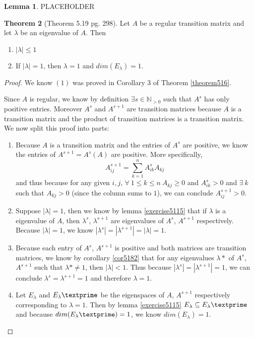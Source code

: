 \documentclass{amsart}
\theoremstyle{definition}
\newtheorem{theorem}{Theorem}
\newtheorem{lemma}[theorem]{Lemma}
\theoremstyle{remark}
\numberwithin{equation}{section}
\begin{document}
\begin{lemma}

PLACEHOLDER
\end{lemma}

\begin{theorem}[Theorem 5.19 pg. 298]\label{theorem519}
Let $A$ be a regular transition matrix and let $\lambda$ be an eigenvalue of $A$.  Then 

\begin{enumerate}
	\item $|\lambda| \leq 1$
	\item If $|\lambda| = 1$, then $\lambda = 1$ and $dim(E_{\lambda}) = 1$.

\end{enumerate}

\end{theorem}

\begin{proof}

We know $(1)$ was proved in Corollary 3 of Theorem \ref{theorem516}.

Since $A$ is regular, we know by definition $\exists s \in \mathbb{N}_{>0}$ such that $A^s$ has only positive entries.
Moreover $A^s$ and $A^{s+1}$ are transition matrices because $A$ is a transition matrix and the product of transition matrices is a transition matrix.
We now split this proof into parts:

\begin{enumerate}
	\item 
		Because $A$ is a transition matrix and the entries of $A^s$ are positive, we know the entries of $A^{s+1} = A^s(A)$ are positive.
		More specifically,
		$$A^{s+1}_{ij} = \sum_{k = 1}^nA^s_{ik}A_{kj}$$
		and thus because for any given $i, j$, $\forall\ 1 \leq k \leq n\ A_{kj} \geq 0$ and $A^s_{ik} > 0$ and $\exists\ k$ such that $A_{kj}  > 0$ (since the column sums to $1$), we can conclude $A^{s+1}_{ij} > 0$.

	\item 
		Suppose $|\lambda| = 1$, then we know by lemma \ref{exercise5115} that if $\lambda$ is a eigenvalue of $A$, then $\lambda^s$, $\lambda^{s+1}$ are eigenvalues of $A^s$, $A^{s+1}$ respectively.  Because $|\lambda| = 1$, we know $ |\lambda^s |= |\lambda^{s+1} |= |\lambda| = 1$.

	\item
		Because each entry of $A^s$, $A^{s+1}$ is positive and both matrices are transition matrices, we know by corollary \ref{cor5182} that for any eigenvalues $\lambda*$ of $A^s$, $A^{s+1}$ such that $\lambda* \neq 1$, then $|\lambda| < 1$.
		Thus because $|\lambda^s |= |\lambda^{s+1} |= 1 $, we can conclude $\lambda^s = \lambda^{s+1} = 1$ and therefore $\lambda = 1$.
	\item 

		Let $E_{\lambda}$ and $E_{\lambda}\textprime$ be the eigenspaces of $A$, $A^{s+1}$ respectively corresponding to $\lambda = 1$.
		Then by lemma \ref{exercise5115} $E_{\lambda} \subseteq E_{\lambda}\textprime$ and because $dim(E_{\lambda}\textprime) = 1$, we know $dim(E_{\lambda}) = 1$.
\end{enumerate}

\end{proof}
\end{document}
